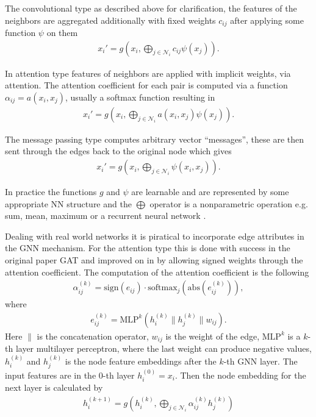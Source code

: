 The convolutional type \cite[Chapter~5]{gnn_overview} as described above for
clarification, the features of the neighbors are aggregated additionally with
fixed weights $c_{ij}$ after applying some function $\psi$ on them
\begin{align}
    x_i' = g\left( x_i, \bigoplus_{j\in \mathcal{N}_i} c_{ij} \psi(x_j) \right).
\end{align}

In attention type \cite{gan_velickovic} features of neighbors are applied
with implicit weights, via attention. The attention coefficient for each
pair is computed via a function $\alpha_{ij} = a(x_i, x_j)$, usually a
softmax function resulting in
\begin{align}
    x_i' = g\left( x_i, \bigoplus_{j\in \mathcal{N}_i} a(x_i, x_j) \psi(x_j) \right).
\end{align}

The message passing type \cite[Chapter~5]{gnn_overview} computes arbitrary
vector "`messages"', these are then sent through the edges back to the
original node which gives
\begin{align}
    x_i' = g\left( x_i, \bigoplus_{j\in \mathcal{N}_i} \psi(x_i, x_j) \right).
\end{align}

In practice the functions $g$ and $\psi$ are learnable and are represented by
some appropriate NN structure and the $\bigoplus$ operator is a nonparametric
operation e.g. sum, mean, maximum or a recurrent neural network
\cite[Chapter~5]{gnn_overview}.
\newline

Dealing with real world networks it is piratical to incorporate edge
attributes in the GNN mechanism. For the attention type this is done with
success in the original paper GAT \cite{gan_velickovic} and improved on in
\cite{wsgat} by allowing signed weights through the attention coefficient.
The computation of the attention coefficient is the following
\begin{align}
    \alpha_{ij}^{(k)} = \text{sign}\left(e_{ij}  \right) \cdot
    \text{softmax}_j\left(\text{abs}(e_{ij}^{(k)})\right),
\end{align}
where
\begin{align}
    e_{ij}^{(k)} = \text{MLP}^{k}\left(h_i^{(k)} \| h_j^{(k)} \| w_{ij}\right).
\end{align}
Here $\|$ is the concatenation operator,  $w_{ij}$ is the weight
of the edge, $\text{MLP}^{k}$ is a $k$-th layer multilayer perceptron, where
the last weight can produce negative values, $h_i^{(k)}$ and $h_j^{(k)}$ is
the node feature embeddings after the $k$-th GNN layer. The input features
are in the 0-th layer $h_i^{(0)} = x_i$. Then the node embedding for the next
layer is calculated by
\begin{align}
    h_{i}^{(k+1)} = g\left( h_i^{(k)},
    \bigoplus_{j\in\mathcal{N}_i}\alpha_{ij}^{(k)}h_j^{(k)} \right)
\end{align}

